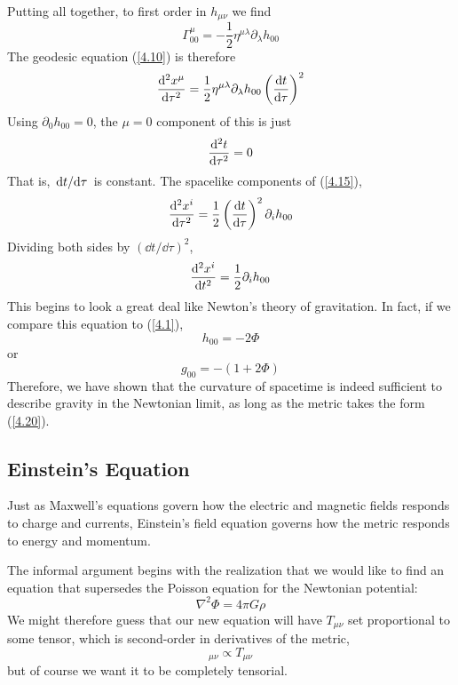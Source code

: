Putting all together, to first order in $h_{\mu\nu}$ we find
\begin{equation*}
    \Gamma^\mu_{00}=-\frac{1}{2}\eta^{\mu\lambda}\partial_\lambda h_{00}
\end{equation*}
The geodesic equation (\ref{4.10}) is therefore
\begin{equation}\label{4.15}
    \dv[2]{x^\mu}{\tau}=\frac{1}{2}\eta^{\mu\lambda}\partial_\lambda h_{00}\left(\dv{t}{\tau}\right)^2
\end{equation}
Using $\partial_0 h_{00}=0$, the $\mu=0$ component of this is just
\begin{equation*}
    \dv[2]{t}{\tau}=0
\end{equation*}
That is, $\dv*{t}{\tau}$ is constant. The spacelike components of (\ref{4.15}),
\begin{equation*}
    \dv[2]{x^{i}}{\tau}=\frac{1}{2}\left(\dv{t}{\tau}\right)^2\partial_i h_{00}
\end{equation*}
Dividing both sides by $(\dd t/\dd\tau)^2$,
\begin{equation*}
    \dv[2]{x^{i}}{t}=\frac{1}{2}\partial_i h_{00}
\end{equation*}
This begins to look a great deal like Newton's theory of gravitation. In fact, if we compare this equation to (\ref{4.1}),
\begin{equation}\label{4.19}
    h_{00}=-2\Phi
\end{equation}
or
\begin{equation}\label{4.20}
    g_{00}=-(1+2\Phi)
\end{equation}
Therefore, we have shown that the curvature of spacetime is indeed sufficient to describe gravity in the Newtonian limit, as long as the metric takes the form (\ref{4.20}).

\subsection{Einstein's Equation}
Just as Maxwell's equations govern how the electric and magnetic fields responds to charge and currents, Einstein's field equation governs how the metric responds to energy and momentum.

The informal argument begins with the realization that we would like to find an equation that supersedes the Poisson equation for the Newtonian potential:
\begin{equation}\label{4.22}
    \nabla^2\Phi=4\pi G\rho
\end{equation}
We might therefore guess that our new equation will have $T_{\mu\nu}$ set proportional to some tensor, which is second-order in derivatives of the metric,
\begin{equation*}
    [\nabla^2 g]_{\mu\nu}\propto T_{\mu\nu}
\end{equation*}
but of course we want it to be completely tensorial.

